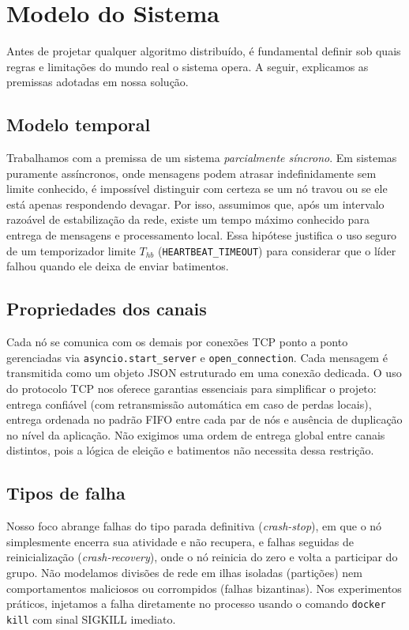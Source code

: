 \documentclass[journal]{IEEEtran}
\begin{document}
\section{Modelo do Sistema}
Antes de projetar qualquer algoritmo distribuído, é fundamental definir sob quais regras e limitações do mundo real o sistema opera. A seguir, explicamos as premissas adotadas em nossa solução.

\subsection{Modelo temporal}
Trabalhamos com a premissa de um sistema \emph{parcialmente síncrono}. Em sistemas puramente assíncronos, onde mensagens podem atrasar indefinidamente sem limite conhecido, é impossível distinguir com certeza se um nó travou ou se ele está apenas respondendo devagar. Por isso, assumimos que, após um intervalo razoável de estabilização da rede, existe um tempo máximo conhecido para entrega de mensagens e processamento local. Essa hipótese justifica o uso seguro de um temporizador limite $T_{hb}$ (\texttt{HEARTBEAT\_TIMEOUT}) para considerar que o líder falhou quando ele deixa de enviar batimentos.

\subsection{Propriedades dos canais}
Cada nó se comunica com os demais por conexões TCP ponto a ponto gerenciadas via \texttt{asyncio.start\_server} e \texttt{open\_connection}. Cada mensagem é transmitida como um objeto JSON estruturado em uma conexão dedicada. O uso do protocolo TCP nos oferece garantias essenciais para simplificar o projeto: entrega confiável (com retransmissão automática em caso de perdas locais), entrega ordenada no padrão FIFO entre cada par de nós e ausência de duplicação no nível da aplicação. Não exigimos uma ordem de entrega global entre canais distintos, pois a lógica de eleição e batimentos não necessita dessa restrição.

\subsection{Tipos de falha}
Nosso foco abrange falhas do tipo parada definitiva (\emph{crash-stop}), em que o nó simplesmente encerra sua atividade e não recupera, e falhas seguidas de reinicialização (\emph{crash-recovery}), onde o nó reinicia do zero e volta a participar do grupo. Não modelamos divisões de rede em ilhas isoladas (partições) nem comportamentos maliciosos ou corrompidos (falhas bizantinas). Nos experimentos práticos, injetamos a falha diretamente no processo usando o comando \texttt{docker kill} com sinal SIGKILL imediato.
\end{document}
